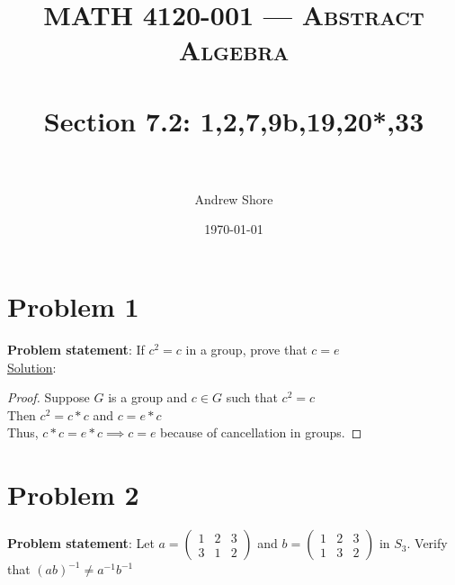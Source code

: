 \documentclass{article} %
\title{ 
\normalfont \normalsize 
\textsc{MATH 4120-001 --- Abstract Algebra} \\
\horrule{0.5pt} \\[0cm] %
\huge Section 7.2: 1,2,7,9b,19,20*,33 \\ %
\horrule{2pt} \\[0cm] %
}
\author{Andrew Shore} %
\date{\normalsize\today} %
\begin{document}
\maketitle %

\section*{Problem 1}


\textbf{Problem statement}: If $c^2 = c$ in a group, prove that $c = e$
\\

\underline{Solution}: 
\begin{addmargin}[1em]{0em}
\begin{proof}
Suppose $G$ is a group and $c \in G$ such that $c^2 = c$
\\Then $c^2 = c*c$ and $c = e*c$
\\Thus, $c*c = e*c \implies c = e$ because of cancellation in groups.
\end{proof}
\end{addmargin}    

\newpage
\section*{Problem 2}


\textbf{Problem statement}: Let $a = \left( \begin{matrix} 1 & 2 & 3 \\ 3 & 1 & 2 \end{matrix}\right)$ and $b = \left( \begin{matrix} 1 & 2 & 3 \\ 1 & 3 & 2 \end{matrix}\right)$ in $S_3$.  Verify that $(ab)^{-1} \neq a^{-1}b^{-1}$
\\
\end{document}
